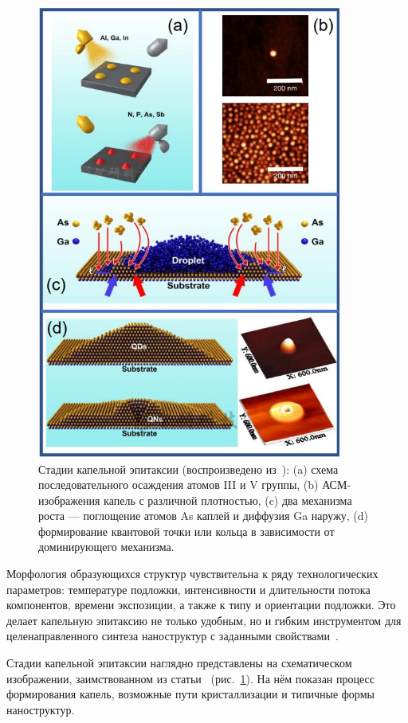 \documentclass[14pt,oneside]{extarticle}
\begin{document}
\begin{figure}[H]
    \begin{center}
        \includegraphics[width=10cm]{images/gurioli_fig1.png}
        \caption{\label{fig:gurioli1}
            Стадии капельной эпитаксии (воспроизведено из~\cite{gurioli2021}): (a) схема последовательного осаждения атомов III и V группы, (b) АСМ-изображения капель с различной плотностью, (c) два механизма роста — поглощение атомов As каплей и диффузия Ga наружу, (d) формирование квантовой точки или кольца в зависимости от доминирующего механизма.}
    \end{center}
\end{figure}

Морфология образующихся структур чувствительна к ряду технологических параметров: температуре подложки, интенсивности и длительности потока компонентов, времени экспозиции, а также к типу и ориентации подложки. Это делает капельную эпитаксию не только удобным, но и гибким инструментом для целенаправленного синтеза наноструктур с заданными свойствами~\cite{sibirmovskiy2014}.

Стадии капельной эпитаксии наглядно представлены на схематическом изображении, заимствованном из статьи~\cite{gurioli2021} (рис.~\ref{fig:gurioli1}). На нём показан процесс формирования капель, возможные пути кристаллизации и типичные формы наноструктур.
\end{document}
